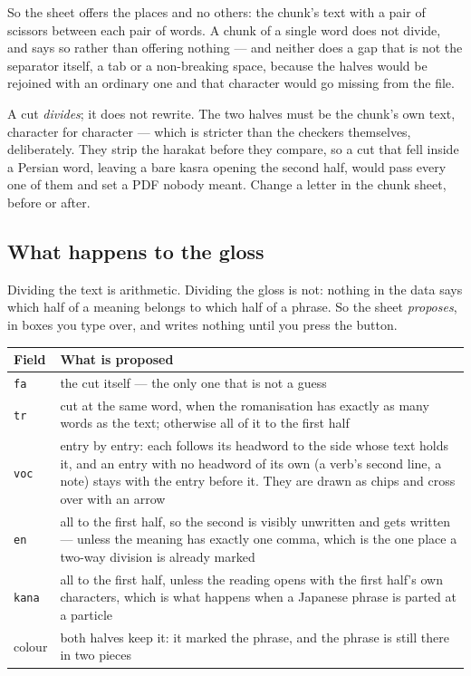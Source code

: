 \documentclass[11pt,oneside]{report}
\begin{document}
So the sheet offers the places and no others: the chunk's text with a pair of
scissors between each pair of words. A chunk of a single word does
not divide, and says so rather than offering nothing --- and neither does a
gap that is not the separator itself, a tab or a non-breaking space, because
the halves would be rejoined with an ordinary one and that character would go
missing from the file.

A cut \emph{divides}; it does not rewrite. The two halves must be the chunk's
own text, character for character --- which is stricter than the checkers
themselves, deliberately. They strip the harakat before they compare, so a cut
that fell inside a Persian word, leaving a bare kasra opening the second half,
would pass every one of them and set a PDF nobody meant. Change a letter in
the chunk sheet, before or after.

\subsection*{What happens to the gloss}

Dividing the text is arithmetic. Dividing the gloss is not: nothing in the
data says which half of a meaning belongs to which half of a phrase. So the
sheet \emph{proposes}, in boxes you type over, and writes nothing until you
press the button.

\begin{center}
\begin{tabular}{@{}lp{}@{}}
\toprule
\textsf{Field} & \textsf{What is proposed} \\
\midrule
\texttt{fa} & the cut itself --- the only one that is not a guess \\
\addlinespace
\texttt{tr} & cut at the same word, when the romanisation has exactly as many
words as the text; otherwise all of it to the first half \\
\addlinespace
\texttt{voc} & entry by entry: each follows its headword to the side whose
text holds it, and an entry with no headword of its own (a verb's second
line, a note) stays with the entry before it. They are drawn as chips and
cross over with an arrow \\
\addlinespace
\texttt{en} & all to the first half, so the second is visibly unwritten and
gets written --- unless the meaning has exactly one comma, which is the one
place a two-way division is already marked \\
\addlinespace
\texttt{kana} & all to the first half, unless the reading opens with the
first half's own characters, which is what happens when a Japanese phrase is
parted at a particle \\
\addlinespace
colour & both halves keep it: it marked the phrase, and the phrase is still
there in two pieces \\
\bottomrule
\end{tabular}
\end{center}
\end{document}

